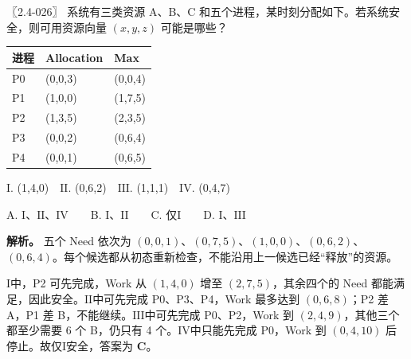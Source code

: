 \begin{example}[配套例题]

〖2.4-026〗 系统有三类资源 A、B、C 和五个进程，某时刻分配如下。若系统安全，则可用资源向量 \((x,y,z)\) 可能是哪些？

\begin{wideblock}

\par\medskip\noindent\begin{minipage}{\linewidth}\fontsize{9.3}{12}\selectfont\begin{tabularx}{\linewidth}{@{}YYY@{}}
\toprule\noalign{}
进程 & Allocation & Max \\
\midrule\noalign{}


P0 & (0,0,3) & (0,0,4) \\
P1 & (1,0,0) & (1,7,5) \\
P2 & (1,3,5) & (2,3,5) \\
P3 & (0,0,2) & (0,6,4) \\
P4 & (0,0,1) & (0,6,5) \\
\bottomrule\end{tabularx}
\end{minipage}\par\medskip

\end{wideblock}

\ensuremath{\mathrm{I}}. (1,4,0)　\ensuremath{\mathrm{II}}. (0,6,2)　\ensuremath{\mathrm{III}}. (1,1,1)　\ensuremath{\mathrm{IV}}. (0,4,7)

A. \ensuremath{\mathrm{I}}、\ensuremath{\mathrm{II}}、\ensuremath{\mathrm{IV}}　　B. \ensuremath{\mathrm{I}}、\ensuremath{\mathrm{II}}　　C. 仅\ensuremath{\mathrm{I}}　　D. \ensuremath{\mathrm{I}}、\ensuremath{\mathrm{III}}

\end{example}

\textbf{解析。} 五个 Need 依次为 \((0,0,1)\)、\((0,7,5)\)、\((1,0,0)\)、\((0,6,2)\)、\((0,6,4)\)。每个候选都从初态重新检查，不能沿用上一候选已经``释放''的资源。

\ensuremath{\mathrm{I}}中，P2 可先完成，Work 从 \((1,4,0)\) 增至 \((2,7,5)\)，其余四个的 Need 都能满足，因此安全。\ensuremath{\mathrm{II}}中可先完成 P0、P3、P4，Work 最多达到 \((0,6,8)\)；P2 差 A，P1 差 B，不能继续。\ensuremath{\mathrm{III}}中可先完成 P0、P2，Work 到 \((2,4,9)\)，其他三个都至少需要 6 个 B，仍只有 4 个。\ensuremath{\mathrm{IV}}中只能先完成 P0，Work 到 \((0,4,10)\) 后停止。故仅\ensuremath{\mathrm{I}}安全，答案为 \textbf{C}。


